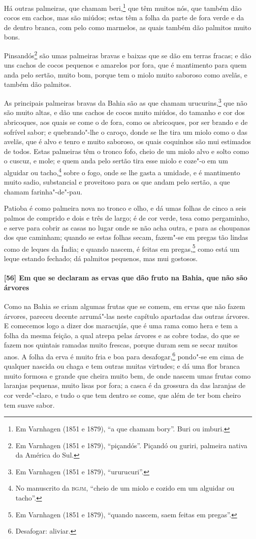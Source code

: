 Há outras palmeiras, que chamam beri,\footnote{ Em Varnhagen (1851 e 1879), ``a que chamam
bory''. Buri ou imburi.} que têm muitos nós, que também dão cocos em cachos, mas são
miúdos; estas têm a folha da parte de fora verde e da de dentro branca, com pelo como
marmelos, as quais também dão palmitos muito bons.

Pinsandós\footnote{ Em Varnhagen (1851 e 1879), ``piçandós''. Piçandó ou guriri, palmeira
nativa da América do Sul.} são umas palmeiras bravas e baixas que se dão em terras fracas;
e dão uns cachos de cocos pequenos e amarelos por fora, que é mantimento para quem anda
pelo sertão, muito bom, porque tem o miolo muito saboroso como avelãs, e também dão
palmitos.

As principais palmeiras bravas da Bahia são as que chamam urucurins,\footnote{ Em
Varnhagen (1851 e 1879), ``ururucuri''.} que não são muito altas, e dão uns cachos de
cocos muito miúdos, do tamanho e cor dos abricoques, aos quais se come o de fora, como os
abricoques, por ser brando e de sofrível sabor; e quebrando"-lhe o caroço, donde se lhe
tira um miolo como o das avelãs, que é alvo e tenro e muito saboroso, os quais coquinhos
são mui estimados de todos. Estas palmeiras têm o tronco fofo, cheio de um miolo alvo e
solto como o cuscuz, e mole; e quem anda pelo sertão tira esse miolo e coze"-o em um
alguidar ou tacho,\footnote{ No manuscrito da \textsc{bgjm}, ``cheio de um miolo e cozido
em um alguidar ou tacho''.} sobre o fogo, onde se lhe gasta a umidade, e é mantimento
muito sadio, substancial e proveitoso para os que andam pelo sertão, a que chamam
farinha"-de"-pau.

Patioba é como palmeira nova no tronco e olho, e dá umas folhas de cinco a seis palmos de
comprido e dois e três de largo; é de cor verde, tesa como pergaminho, e serve para cobrir
as casas no lugar onde se não acha outra, e para as choupanas dos que caminham; quando se
estas folhas secam, fazem"-se em pregas tão lindas como de leques da Índia; e quando
nascem, é feitas em pregas,\footnote{ Em Varnhagen (1851 e 1879), ``quando nascem, saem
feitas em pregas''.} como está um leque estando fechado; dá palmitos pequenos, mas mui
gostosos.

\paragraph{[56] Em que se declaram as ervas que dão fruto na Bahia, que não são árvores}\quad
Como na Bahia se criam algumas frutas que se comem, em ervas que não fazem árvores,
pareceu decente arrumá"-las neste capítulo apartadas das outras árvores. E comecemos logo a
dizer dos maracujás, que é uma rama como hera e tem a folha da mesma feição, a qual atrepa
pelas árvores e as cobre todas, do que se fazem nos quintais ramadas muito frescas, porque
duram sem se secar muitos anos. A folha da erva é muito fria e boa para
desafogar,\footnote{ Desafogar: aliviar.} pondo"-se em cima de qualquer nascida ou chaga e
tem outras muitas virtudes; e dá uma flor branca muito formosa e grande que cheira muito
bem, de onde nascem umas frutas como laranjas pequenas, muito lisas por fora; a casca é da
grossura da das laranjas de cor verde"-claro, e tudo o que tem dentro se come, que além de
ter bom cheiro tem suave sabor.

